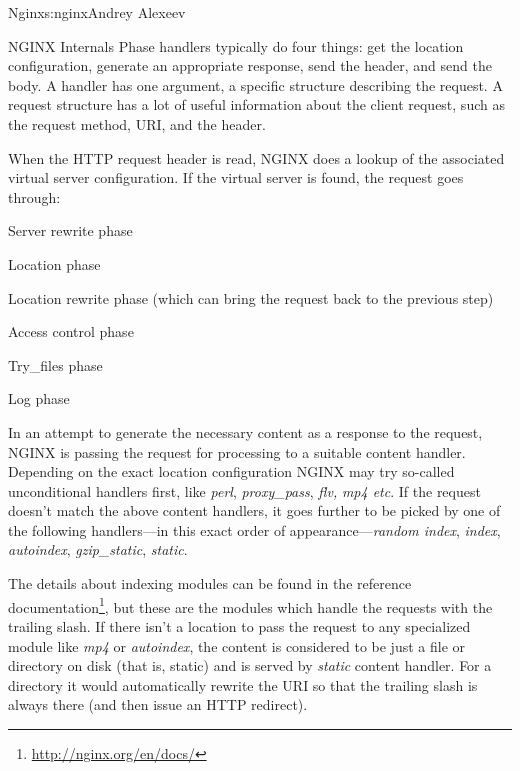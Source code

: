\begin{aosachapter}{Nginx}{s:nginx}{Andrey Alexeev}
\begin{aosasect1}{NGINX Internals}
Phase handlers typically do four things: get the location
configuration, generate an appropriate response, send the header, and
send the body. A handler has one argument, a specific structure
describing the request. A request structure has a lot of useful
information about the client request, such as the request method, URI,
and the header.

When the HTTP request header is read, NGINX does a lookup of the
associated virtual server configuration. If the virtual server is
found, the request goes through:

\begin{aosaitemize}

\item Server rewrite phase

\item Location phase

\item Location rewrite phase (which can bring the request back to the
previous step)

\item Access control phase

\item Try\_files phase

\item Log phase

\end{aosaitemize}

In an attempt to generate the necessary content as a response to the
request, NGINX is passing the request for processing to a suitable
content handler. Depending on the exact location configuration NGINX
may try so-called unconditional handlers first, like \emph{perl},
\emph{proxy\_pass}, \emph{flv,} \emph{mp4 etc}. If the request doesn't
match the above content handlers, it goes further to be picked by one
of the following handlers---in this exact order of
appearance---\emph{random index}, \emph{index}, \emph{autoindex},
\emph{gzip\_static}, \emph{static}.

The details about indexing modules can be found in the reference
documentation\footnote{\url{http://nginx.org/en/docs/}}, but these are
the modules which handle the requests with the trailing slash. If
there isn't a location to pass the request to any specialized module
like \emph{mp4} or \emph{autoindex}, the content is considered to be
just a file or directory on disk (that is, static) and is served by
\emph{static} content handler. For a directory it would automatically
rewrite the URI so that the trailing slash is always there (and then
issue an HTTP redirect).


\end{aosasect1}
\end{aosachapter}
